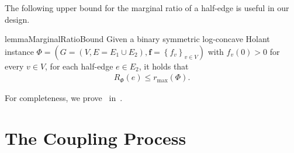 \documentclass[11pt]{article}
\newtheorem{lemma}[theorem]{Lemma}
\newtheorem*{remark}{Remark}
\newcommand{\set}[1]{\left\{#1\right\}}
\newcommand{\defeq}{\triangleq} \renewcommand{\d}{\,\-d}
\newcommand{\vecf}{\boldsymbol{f}}
\newcommand{\zdtodo}[1]{\todo[color = blue!40, size = \tiny]{\textbf{zhidan:} #1}}
\newcommand{\qgl}[1]{{\color{purple}{#1}}}
\newcommand{\zdnew}[1]{{\color{cyan} #1}}
\begin{document}


The following upper bound for the marginal ratio of a half-edge is useful in our design.
\begin{restatable}{lemma}{MarginalRatioBound} \label{lem:marginal-ratio-upper-bound}
     Given a binary symmetric log-concave Holant instance $\Phi = \left(G = (V, E = E_1 \cup E_2), \vecf = \set{f_v}_{v \in V}\right)$ with $f_v(0) > 0$ for every $v \in V$, for each half-edge $e \in E_2$, it holds that
    \begin{align*}
        R_{\Phi}(e) \le r_{\max}(\Phi).
    \end{align*}
\end{restatable}
For completeness, we prove~ in~.

\section{The Coupling Process}
\end{document}
